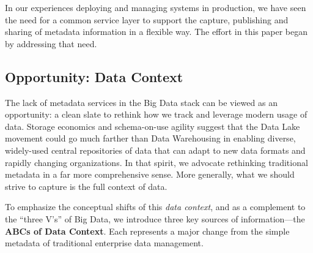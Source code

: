 \documentclass{sig-alternate}
\begin{document}

In our experiences deploying and managing systems in production, we 
have seen the need for a common service layer to support the capture, publishing and sharing of metadata information in a flexible way. 
The effort in this paper began by addressing that need.

\subsection{Opportunity: Data Context}
The lack of metadata services in the Big Data stack can be viewed as an opportunity:
a clean slate to rethink how we track and leverage modern usage of data.
Storage economics and schema-on-use agility suggest that the Data Lake movement could go much farther than Data Warehousing in enabling diverse, widely-used central repositories of data that can adapt to new data formats and rapidly changing organizations.
In that spirit, we advocate rethinking traditional metadata in a far more comprehensive sense. 
More generally, what we should strive to capture is the full context of data.

To emphasize the conceptual shifts of this \emph{data context}, and as a complement to the ``three V's'' of Big Data,
we introduce three key sources of information---the \textbf{ABCs of Data Context}. Each represents a major change from the simple metadata of traditional enterprise data management.

\end{document}
